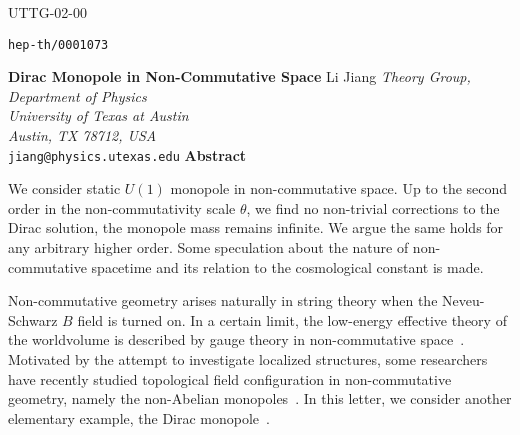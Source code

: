\documentclass[a4paper,12pt]{article}
\begin{document}
\begin{titlepage}
\rm
\normalsize
\begin{flushright} 
UTTG-02-00

\texttt{hep-th/0001073}
\end{flushright} 
\vskip 2.5cm
\begin{center}
{\Large \bf Dirac Monopole in Non-Commutative Space}
\vskip 1.5cm
Li Jiang
\vskip 0.5cm
\textit{Theory Group, Department of Physics\\
        University of Texas at Austin\\
        Austin, TX 78712, USA\\}
\texttt{jiang@physics.utexas.edu}
\vskip 3.5cm
\textbf{Abstract}
\end{center}
\vskip 0.5cm
\noindent We consider static $U(1)$ monopole in non-commutative space.
Up to the second order in the non-commutativity scale $\theta$, we
f\mbox{}ind no non-trivial corrections to the Dirac solution, the monopole
mass remains inf\mbox{}inite. We argue the
same holds for any arbitrary higher order. Some speculation about the
nature of non-commutative spacetime and its relation to the cosmological
constant is made.  
\end{titlepage}

\noindent Non-commutative geometry arises naturally in string theory
when the Neveu-Schwarz $B$ f\mbox{}ield is turned on. In a certain limit,
the low-energy ef\mbox{}fective theory of the worldvolume  is described 
by gauge theory in 
non-commutative space~\cite{sw}. Motivated by the attempt to investigate
localized structures, some researchers have recently studied topological 
f\mbox{}ield conf\mbox{}iguration
in non-commutative geometry, namely the non-Abelian monopoles~\cite{hh,hhm,db}.
In this letter, we consider another elementary example, the Dirac 
monopole~\cite{pd}.
\end{document}

